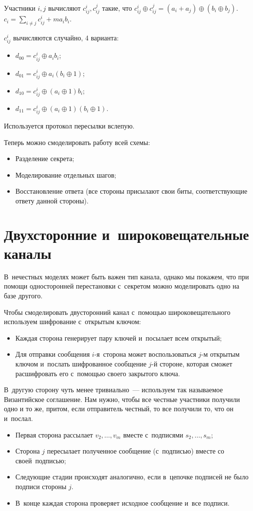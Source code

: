 \documentclass{article}
\begin{document}
Участники $i, j$ вычисляют $c_{ij}^i, c_{ij}^j$ такие, что $c_{ij}^i \oplus
c_{ij}^j = (a_i + a_j) \oplus (b_i \oplus b_j)$. $c_i = \sum\limits_{i \ne j}
c_{ij}^i + ma_ib_i$.

$c_{ij}^i$ вычисляются случайно, 4 варианта:
\begin{itemize}
	\item $d_{00} = c_{ij}^i \oplus a_i b_i$;
	\item $d_{01} = c_{ij}^i \oplus a_i (b_i \oplus 1)$;
	\item $d_{10} = c_{ij}^i \oplus (a_i \oplus 1) b_i$;
	\item $d_{11} = c_{ij}^i \oplus (a_i \oplus 1)(b_i \oplus 1)$.
\end{itemize}
Используется протокол пересылки вслепую.

Теперь можно смоделировать работу всей схемы:
\begin{itemize}
	\item Разделение секрета;
	\item Моделирование отдельных шагов;
	\item Восстановление ответа (все стороны присылают свои биты, соответствующие
		ответу данной стороны).
\end{itemize}

\section{Двухсторонние и~широковещательные каналы}

В~нечестных моделях может быть важен тип канала, однако мы покажем, что при
помощи односторонней перестановки с~секретом можно моделировать одно на базе
другого.

Чтобы смоделировать двусторонний канал с~помощью широковещательного используем
шифрование с~открытым ключом:
\begin{itemize}
	\item Каждая сторона генерирует пару ключей и~посылает всем открытый;
	\item Для отправки сообщения $i$-я~сторона может воспользоваться $j$-м
		открытым ключом и~послать шифрованное сообщение $j$-й стороне, которая
		сможет расшифровать его с~помощью своего закрытого ключа.
\end{itemize}

В~другую сторону чуть менее тривиально~--- используем так называемое
Византийское соглашение. Нам нужно, чтобы все честные участники получили одно и
то же, притом, если отправитель честный, то все получили то, что он и~послал.
\begin{itemize}
	\item Первая сторона рассылает $v_2, \ldots, v_m$ вместе с~подписями $s_2,
		\ldots, s_m$;
	\item Сторона $j$ пересылает полученное сообщение (с~подписью) вместе со
		своей~подписью;
	\item Следующие стадии происходят аналогично, если в~цепочке подписей не было
		подписи стороны $j$.
	\item В~конце каждая сторона проверяет исходное сообщение и~все подписи.
\end{itemize}
\end{document}
